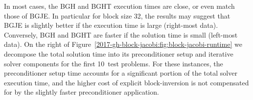 In most cases, the BGH and BGHT execution times are close, or even match those of BGJE.
In particular for block size 32, 
the results may suggest that BGJE is slightly better if the execution time is large (right-most data).
Conversely, BGH and BGHT are faster if the solution time is small (left-most data).
On the right of Figure~\ref{2017-gh-block-jacobi:fig:block-jacobi-runtime} we decompose the total solution time 
into its preconditioner setup and iterative solver components for the first 10~test problems.
For these instances, the preconditioner setup time accounts for a significant portion
of the total solver execution time, and the higher cost of explicit block-inversion
is not compensated for by the slightly faster preconditioner application.
